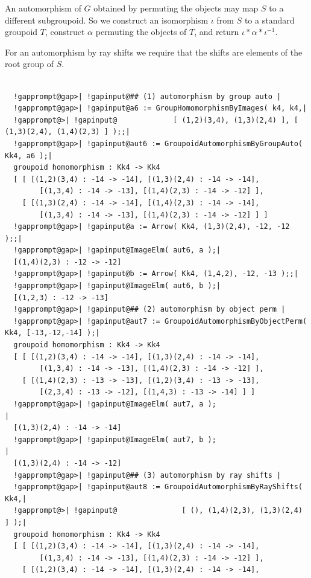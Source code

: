 \documentclass[a4paper,11pt]{report}
\begin{document}
{{{ An automorphism of $G$ obtained by permuting the objects may map $S$ to a different subgroupoid. So we construct an isomorphism $\iota$ from $S$ to a standard groupoid $T$, construct $\alpha$ permuting the objects of $T$, and return $\iota*\alpha*\iota^{-1}$. 

 For an automorphism by ray shifts we require that the shifts are elements of
the root group of $S$. 

 
\begin{Verbatim}[commandchars=!@|,fontsize=\small,frame=single,label=Example]
  
  !gapprompt@gap>| !gapinput@## (1) automorphism by group auto |
  !gapprompt@gap>| !gapinput@a6 := GroupHomomorphismByImages( k4, k4,|
  !gapprompt@>| !gapinput@             [ (1,2)(3,4), (1,3)(2,4) ], [ (1,3)(2,4), (1,4)(2,3) ] );;|
  !gapprompt@gap>| !gapinput@aut6 := GroupoidAutomorphismByGroupAuto( Kk4, a6 );|
  groupoid homomorphism : Kk4 -> Kk4
  [ [ [(1,2)(3,4) : -14 -> -14], [(1,3)(2,4) : -14 -> -14], 
        [(1,3,4) : -14 -> -13], [(1,4)(2,3) : -14 -> -12] ], 
    [ [(1,3)(2,4) : -14 -> -14], [(1,4)(2,3) : -14 -> -14], 
        [(1,3,4) : -14 -> -13], [(1,4)(2,3) : -14 -> -12] ] ]
  !gapprompt@gap>| !gapinput@a := Arrow( Kk4, (1,3)(2,4), -12, -12 );;|
  !gapprompt@gap>| !gapinput@ImageElm( aut6, a );|
  [(1,4)(2,3) : -12 -> -12]
  !gapprompt@gap>| !gapinput@b := Arrow( Kk4, (1,4,2), -12, -13 );;|
  !gapprompt@gap>| !gapinput@ImageElm( aut6, b );|
  [(1,2,3) : -12 -> -13]
  !gapprompt@gap>| !gapinput@## (2) automorphism by object perm |
  !gapprompt@gap>| !gapinput@aut7 := GroupoidAutomorphismByObjectPerm( Kk4, [-13,-12,-14] );|
  groupoid homomorphism : Kk4 -> Kk4
  [ [ [(1,2)(3,4) : -14 -> -14], [(1,3)(2,4) : -14 -> -14], 
        [(1,3,4) : -14 -> -13], [(1,4)(2,3) : -14 -> -12] ], 
    [ [(1,4)(2,3) : -13 -> -13], [(1,2)(3,4) : -13 -> -13], 
        [(2,3,4) : -13 -> -12], [(1,4,3) : -13 -> -14] ] ]
  !gapprompt@gap>| !gapinput@ImageElm( aut7, a );                                           |
  [(1,3)(2,4) : -14 -> -14]
  !gapprompt@gap>| !gapinput@ImageElm( aut7, b );                                           |
  [(1,3)(2,4) : -14 -> -12]
  !gapprompt@gap>| !gapinput@## (3) automorphism by ray shifts |
  !gapprompt@gap>| !gapinput@aut8 := GroupoidAutomorphismByRayShifts( Kk4,|
  !gapprompt@>| !gapinput@               [ (), (1,4)(2,3), (1,3)(2,4) ] );|
  groupoid homomorphism : Kk4 -> Kk4
  [ [ [(1,2)(3,4) : -14 -> -14], [(1,3)(2,4) : -14 -> -14], 
        [(1,3,4) : -14 -> -13], [(1,4)(2,3) : -14 -> -12] ], 
    [ [(1,2)(3,4) : -14 -> -14], [(1,3)(2,4) : -14 -> -14], 

\end{Verbatim}}}}
\end{document}
